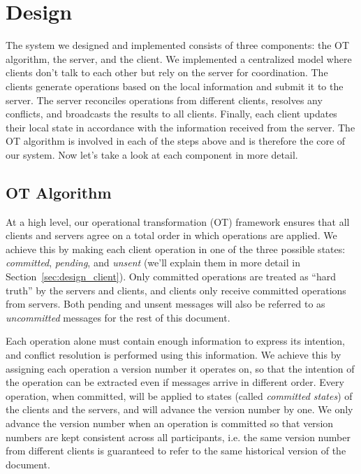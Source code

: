 \section{Design}

The system we designed and implemented consists of three components: the OT
algorithm, the server, and the client. We implemented a centralized model where
clients don't talk to each other but rely on the server for coordination. The
clients generate operations based on the local information and submit it to the
server. The server reconciles operations from different clients, resolves any
conflicts, and broadcasts the results to all clients. Finally, each client
updates their local state in accordance with the information received from the
server. The OT algorithm is involved in each of the steps above and is therefore
the core of our system. Now let's take a look at each component in more detail.

\subsection{OT Algorithm}
\label{sec:design_alg}

At a high level, our operational transformation (OT) framework ensures that all
clients and servers agree on a total order in which operations are applied. We
achieve this by making each client operation in one of the three possible
states: {\em committed}, {\em pending}, and {\em unsent} (we'll explain them in
more detail in Section~\ref{sec:design_client}). Only committed operations are
treated as ``hard truth'' by the servers and clients, and clients only receive
committed operations from servers. Both pending and unsent messages will also be
referred to as {\em uncommitted} messages for the rest of this document.

Each operation alone must contain enough information to express its intention,
and conflict resolution is performed using this information. We achieve this by
assigning each operation a version number it operates on, so that the intention
of the operation can be extracted even if messages arrive in different order.
Every operation, when committed, will be applied to states (called {\em
committed states}) of the clients and the servers, and will advance the version
number by one. We only advance the version number when an operation is committed
so that version numbers are kept consistent across all participants, i.e. the
same version number from different clients is guaranteed to refer to the same
historical version of the document.

